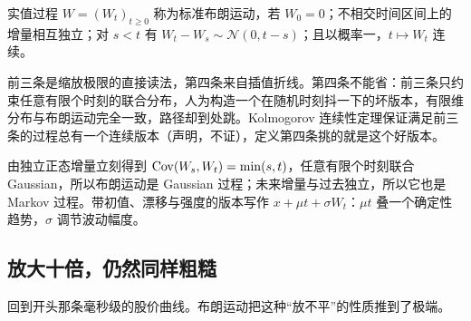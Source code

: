 \begin{definition}
实值过程 \(W=(W_t)_{t\ge0}\) 称为标准布朗运动，若 \(W_0=0\)；不相交时间区间上的增量相互独立；对 \(s<t\) 有 \(W_t-W_s\sim\mathcal N(0,t-s)\)；且以概率一，\(t\mapsto W_t\) 连续。
\end{definition}

前三条是缩放极限的直接读法，第四条来自插值折线。第四条不能省：前三条只约束任意有限个时刻的联合分布，人为构造一个在随机时刻抖一下的坏版本，有限维分布与布朗运动完全一致，路径却到处跳。Kolmogorov 连续性定理保证满足前三条的过程总有一个连续版本（声明，不证），定义第四条挑的就是这个好版本。

由独立正态增量立刻得到 \(\operatorname{Cov}(W_s,W_t)=\min(s,t)\)，任意有限个时刻联合 Gaussian，所以布朗运动是 Gaussian 过程；未来增量与过去独立，所以它也是 Markov 过程。带初值、漂移与强度的版本写作 \(x+\mu t+\sigma W_t\)：\(\mu t\) 叠一个确定性趋势，\(\sigma\) 调节波动幅度。

\subsection{放大十倍，仍然同样粗糙}

回到开头那条毫秒级的股价曲线。布朗运动把这种``放不平''的性质推到了极端。


